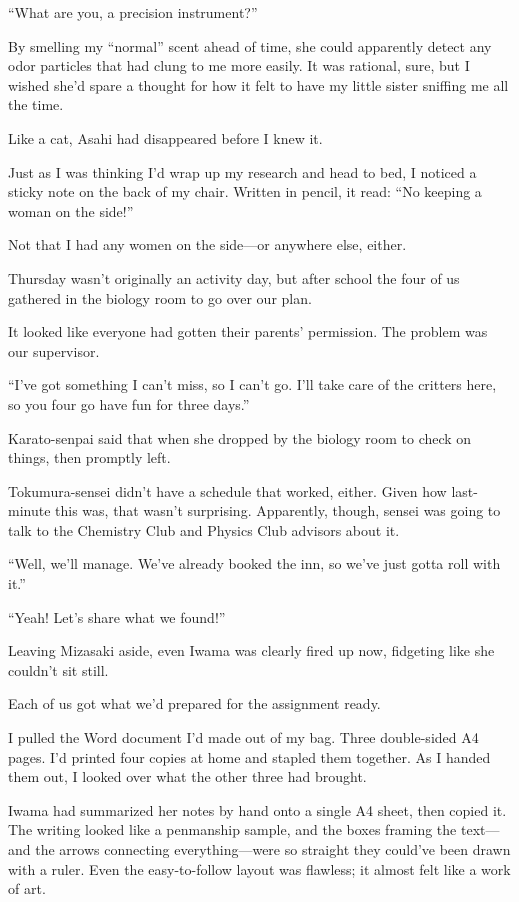 \documentclass[
    a4paper,
    12pt,
    twoside,
    openany,
    UTF8,
    fontset=windows
]{ctexbook}
\begin{document}
``What are you, a precision instrument?''

By smelling my ``normal'' scent ahead of time, she could apparently detect any odor particles that had clung to me more easily. It was rational, sure, but I wished she'd spare a thought for how it felt to have my little sister sniffing me all the time.

Like a cat, Asahi had disappeared before I knew it.

Just as I was thinking I'd wrap up my research and head to bed, I noticed a sticky note on the back of my chair. Written in pencil, it read: ``No keeping a woman on the side!''

Not that I had any women on the side---or anywhere else, either.

Thursday wasn't originally an activity day, but after school the four of us gathered in the biology room to go over our plan.

It looked like everyone had gotten their parents' permission. The problem was our supervisor.

``I've got something I can't miss, so I can't go. I'll take care of the critters here, so you four go have fun for three days.''

Karato-senpai said that when she dropped by the biology room to check on things, then promptly left.

Tokumura-sensei didn't have a schedule that worked, either. Given how last-minute this was, that wasn't surprising. Apparently, though, sensei was going to talk to the Chemistry Club and Physics Club advisors about it.

``Well, we'll manage. We've already booked the inn, so we've just gotta roll with it.''

``Yeah! Let's share what we found!''

Leaving Mizasaki aside, even Iwama was clearly fired up now, fidgeting like she couldn't sit still.

Each of us got what we'd prepared for the assignment ready.

I pulled the Word document I'd made out of my bag. Three double-sided A4 pages. I'd printed four copies at home and stapled them together. As I handed them out, I looked over what the other three had brought.

Iwama had summarized her notes by hand onto a single A4 sheet, then copied it. The writing looked like a penmanship sample, and the boxes framing the text---and the arrows connecting everything---were so straight they could've been drawn with a ruler. Even the easy-to-follow layout was flawless; it almost felt like a work of art.
\end{document}
